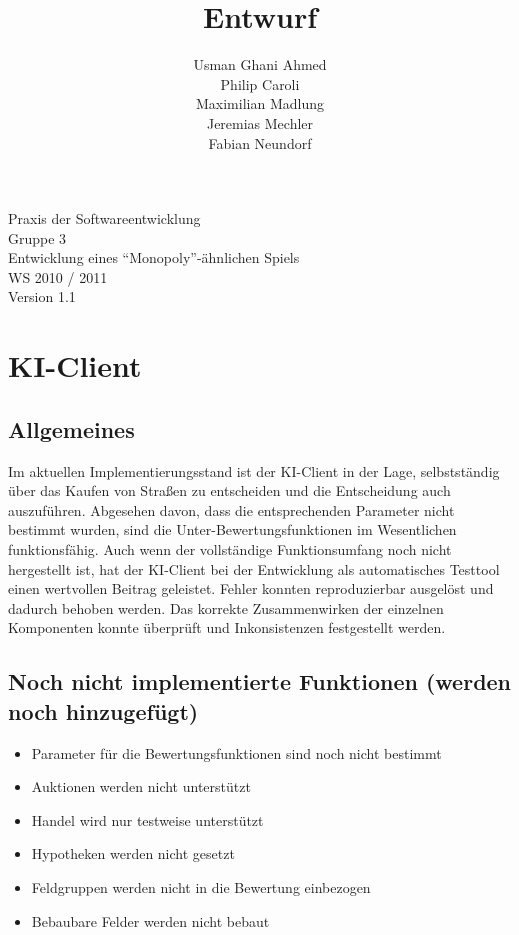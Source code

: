 \documentclass[a4paper,10pt]{article}
\title{Entwurf}
\date{}
\author{Usman Ghani Ahmed \\
Philip Caroli\\
Maximilian Madlung\\ 
Jeremias Mechler\\ 
Fabian Neundorf}
\begin{document}
 
\vspace{5cm}
\maketitle
\begin{center}
\vspace{3cm}
\huge{Praxis der Softwareentwicklung \\
Gruppe 3 \\[0.5cm]
Entwicklung eines "`Monopoly"'-ähnlichen Spiels \\[0.5cm]
WS 2010 / 2011} \\[2cm]
Version 1.1
\end{center}

\newpage

\tableofcontents

\newpage

\section{KI-Client}

\subsection{Allgemeines}
Im aktuellen Implementierungsstand ist der KI-Client in der Lage, selbstständig über das Kaufen von Straßen zu entscheiden und die Entscheidung auch auszuführen. Abgesehen davon, dass die entsprechenden Parameter nicht bestimmt wurden, sind die Unter-Bewertungsfunktionen im Wesentlichen funktionsfähig.
Auch wenn der vollständige Funktionsumfang noch nicht hergestellt ist, hat der KI-Client bei der Entwicklung als automatisches Testtool einen wertvollen Beitrag geleistet. Fehler konnten reproduzierbar ausgelöst und dadurch behoben werden. Das korrekte Zusammenwirken der einzelnen Komponenten konnte überprüft und Inkonsistenzen festgestellt werden.
\subsection{Noch nicht implementierte Funktionen (werden noch hinzugefügt)}
\begin{itemize}
\item Parameter für die Bewertungsfunktionen sind noch nicht bestimmt
\item Auktionen werden nicht unterstützt
\item Handel wird nur testweise unterstützt
\item Hypotheken werden nicht gesetzt
\item Feldgruppen werden nicht in die Bewertung einbezogen
\item Bebaubare Felder werden nicht bebaut
\end{itemize}
\end{document}
